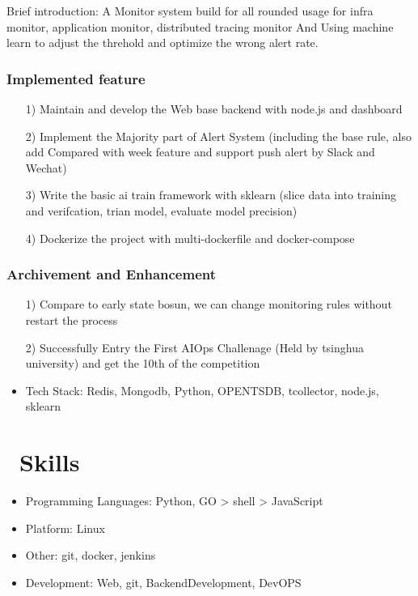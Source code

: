 \documentclass{resume}
\begin{document}
Brief introduction: A Monitor system build for all rounded usage for infra monitor, application monitor, distributed tracing monitor And Using machine learn to adjust the threhold and optimize the wrong alert rate.
    \subsubsection{\textbf {Implemented feature}}
    \begin{itemize}
        \item [1)]  
          Maintain and develop the Web base backend with node.js and dashboard 
        \item [2)]
          Implement the Majority part of Alert System (including the base rule, also add Compared with week feature and support push alert by Slack and Wechat)
        \item [3)]
          Write the basic ai train framework with sklearn (slice data into training and verifcation, trian model, evaluate model precision)
        \item [4)]
          Dockerize the project with multi-dockerfile and docker-compose 
    \end{itemize} 
    \subsubsection{\textbf {Archivement and Enhancement}}
    \begin{itemize}
        \item [1)]
        Compare to early state bosun, we can change monitoring rules without restart the process 
        \item [2)] 
        Successfully Entry the First AIOps Challenage (Held by tsinghua university) and get the 10th of the competition
    \end{itemize}
    \begin{itemize}
    \item Tech Stack: Redis, Mongodb, Python, OPENTSDB, tcollector, node.js, sklearn
    \end{itemize}


\section{\faCogs\ Skills}
\begin{itemize}[parsep=0.5ex]
  \item Programming Languages: Python, GO > shell > JavaScript
  \item Platform: Linux
  \item Other: git, docker, jenkins
  \item Development: Web, git, BackendDevelopment, DevOPS
\end{itemize}
\end{document}
